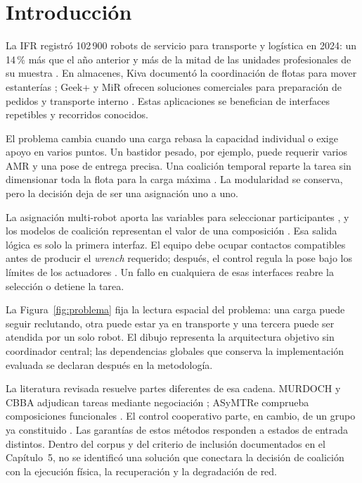 \section{Introducción}
\label{sec:introduction}

La IFR registró 102\,900 robots de servicio para transporte y logística en 2024:
un 14\,\% más que el año anterior y más de la mitad de las unidades profesionales
de su muestra \parencite{internationalFederationRobotics2025}. En almacenes, Kiva
documentó la coordinación de flotas para mover estanterías
\parencite{wurman2008coordinating}; Geek+ y MiR ofrecen soluciones comerciales
para preparación de pedidos y transporte interno
\parencite{geekplusWarehouseSolutions,mirInternalTransport}. Estas aplicaciones
se benefician de interfaces repetibles y recorridos conocidos.

El problema cambia cuando una carga rebasa la capacidad individual o exige apoyo
en varios puntos. Un bastidor pesado, por ejemplo, puede requerir varios AMR y una
pose de entrega precisa. Una coalición temporal reparte la tarea sin dimensionar
toda la flota para la carga máxima \parencite{an2023cooperativeReview}. La
modularidad se conserva, pero la decisión deja de ser una asignación uno a uno.

La asignación multi-robot aporta las variables para seleccionar participantes
\parencite{gerkeyMataric2004MRTA,korsahStentzDias2013iTax}, y los modelos de
coalición representan el valor de una composición
\parencite{shehoryKraus1998Coalition,vigAdams2006Coalition}. Esa salida lógica es
solo la primera interfaz. El equipo debe ocupar contactos compatibles antes de
producir el \emph{wrench} requerido; después, el control regula la pose bajo los
límites de los actuadores
\parencite{parkerTang2006ASyMTRe,zhangParker2013IQASyMTRe,alonsomora2017transport}.
Un fallo en cualquiera de esas interfaces reabre la selección o detiene la tarea.

La Figura~\ref{fig:problema} fija la lectura espacial del problema: una carga
puede seguir reclutando, otra puede estar ya en transporte y una tercera puede
ser atendida por un solo robot. El dibujo representa la arquitectura objetivo
sin coordinador central; las dependencias globales que conserva la
implementación evaluada se declaran después en la metodología.



La literatura revisada resuelve partes diferentes de esa cadena. MURDOCH y CBBA
adjudican tareas mediante negociación
\parencite{gerkeyMataric2002MURDOCH,choiBrunetHow2009CBBA}; ASyMTRe comprueba
composiciones funcionales
\parencite{parkerTang2006ASyMTRe,zhangParker2013IQASyMTRe}. El control cooperativo
parte, en cambio, de un grupo ya constituido \parencite{alonsomora2017transport}.
Las garantías de estos métodos responden a estados de entrada distintos. Dentro
del corpus y del criterio de inclusión documentados en el Capítulo~5, no se
identificó una solución que conectara la decisión de coalición con la ejecución
física, la recuperación y la degradación de red.


